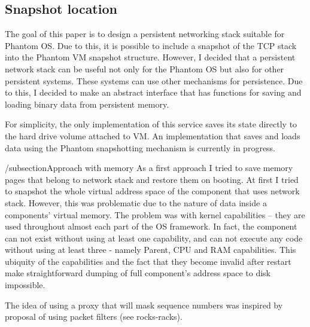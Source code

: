 \subsection{Snapshot location}

The goal of this paper is to design a persistent networking stack suitable for
Phantom OS. Due to this, it is possible to include a snapshot of the TCP stack
into the Phantom VM snapshot structure. However, I decided that a persistent
network stack can be useful not only for the Phantom OS but also for other
persistent systems. These systems can use other mechanisms for persistence. Due
to this, I decided to make an abstract interface that has functions for saving
and loading binary data from persistent memory.

For simplicity, the only implementation of this service saves its state
directly to the hard drive volume attached to VM. An implementation that saves
and loads data using the Phantom snapshotting mechanism is currently in
progress.

/subsection{Approach with memory}
As a first approach I tried to save memory pages that belong to network stack and 
restore them on booting. At first I tried to snapshot the whole virtual address
space of the component that uses network stack. However, this was problematic
due to the nature of data inside a components' virtual memory. The problem was
with kernel capabilities -- they are used throughout almost each part of the OS
framework. In fact, the component can not exist without using at least one
capability, and can not execute any code without using at least three - namely 
Parent, CPU and RAM capabilities. This ubiquity of the capabilities and the fact
that they become invalid after restart make straightforward dumping of full
component's address space to disk impossible.

The idea of using a proxy that will mask sequence numbers was inspired by
proposal of using packet filters (see rocks-racks).